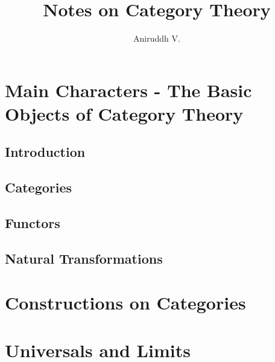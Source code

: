 \documentclass{book}
\title{Notes on Category Theory}
\author{Aniruddh V.}
\begin{document}
\maketitle

\tableofcontents

\part{Main Characters - The Basic Objects of Category Theory}

\chapter{Introduction}
\chapter{Categories}
\chapter{Functors}
\chapter{Natural Transformations}




\part{Constructions on Categories}

\part{Universals and Limits}
\end{document}

